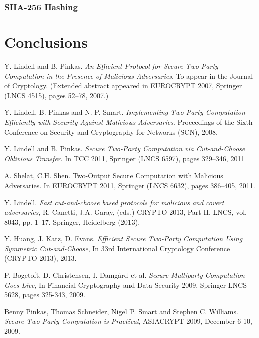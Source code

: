 \documentclass[ %
                    author={Nicholas Tutte},
                supervisor={Prof. Nigel Smart},
                    degree={MEng},
                     title={Secure Two Party Computation},
                  subtitle={A practical comparison of recent protocols},
                      type={Research - GG1K},
                      year={2015} ]{dissertation}
\begin{document}
			\subsection{SHA-256 Hashing}

	\chapter{Conclusions}

		

	\begin{thebibliography}{99}

			Y. Lindell and B. Pinkas. \emph{An Efficient Protocol for Secure Two-Party Computation in the Presence of Malicious Adversaries}. To appear in the Journal of Cryptology. (Extended abstract appeared in EUROCRYPT 2007, Springer (LNCS 4515), pages 52–78, 2007.)

			Y. Lindell, B. Pinkas and N. P. Smart. \emph{Implementing Two-Party Computation Efficiently with Security Against Malicious Adversaries}. Proceedings of the Sixth Conference on Security and Cryptography for Networks (SCN), 2008.

			Y. Lindell and B. Pinkas. \emph{Secure Two-Party Computation via Cut-and-Choose Oblivious Transfer}. In TCC 2011, Springer (LNCS 6597), pages 329–346, 2011

			A. Shelat, C.H. Shen. Two-Output Secure Computation with Malicious Adversaries. In EUROCRYPT 2011, Springer (LNCS 6632), pages 386–405, 2011.

			Y. Lindell.
			\emph{Fast cut-and-choose based protocols for malicious and covert adversaries}, R. Canetti, J.A. Garay, (eds.) CRYPTO 2013, Part II. LNCS, vol. 8043, pp. 1–17. Springer, Heidelberg (2013).

			Y. Huang, J. Katz, D. Evans. \emph{Efficient Secure Two-Party Computation Using Symmetric Cut-and-Choose}, In 33rd International Cryptology Conference (CRYPTO 2013), 2013.

			P. Bogetoft, D. Christensen, I. Damgård et al. \emph{Secure Multiparty Computation Goes Live}, In Financial Cryptography and Data Security 2009, Springer LNCS 5628, pages 325-343, 2009.

			Benny Pinkas, Thomas Schneider, Nigel P. Smart and Stephen C. Williams. \emph{Secure Two-Party Computation is Practical}, ASIACRYPT 2009, December 6-10, 2009.


\end{thebibliography}
\end{document}
